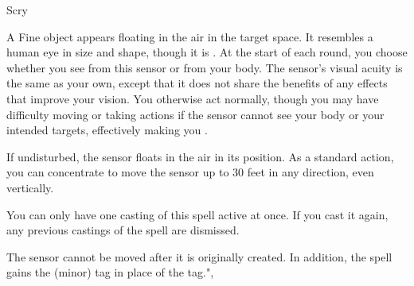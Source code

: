 \newpage
\begin{spellsection}{Scry}

\begin{spellheader}
\end{spellheader}

\begin{spellcontent}

\begin{spelltargetinginfo}




\end{spelltargetinginfo}


\begin{spelleffects}



\spelleffect
A Fine object appears floating in the air in the target space.
It resembles a human eye in size and shape, though it is .
At the start of each round, you choose whether you see from this sensor or from your body.
The sensor's visual acuity is the same as your own, except that it does not share the benefits of any  effects that improve your vision.
You otherwise act normally, though you may have difficulty moving or taking actions if the sensor cannot see your body or your intended targets, effectively making you \blinded.

If undisturbed, the sensor floats in the air in its position.
As a standard action, you can concentrate to move the sensor up to 30 feet in any direction, even vertically.

You can only have one casting of this spell active at once.
If you cast it again, any previous castings of the spell are dismissed.








\end{spelleffects}

\end{spellcontent}
\begin{spellfooter}


\end{spellfooter}
\begin{spellsubcontent}


\begin{spellcantrip}

The sensor cannot be moved after it is originally created.
In addition, the spell gains the  (minor) tag in place of the  tag.",

\end{spellcantrip}


\end{spellsubcontent}
\end{spellsection}


